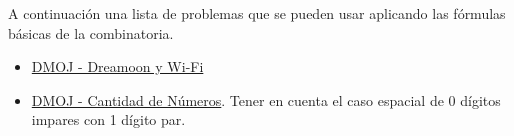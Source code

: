 A continuación una lista de problemas que se pueden usar aplicando las fórmulas básicas de la combinatoria.

\begin{itemize}
	\item \href{https://dmoj.uclv.edu.cu/problem/dreamoon}{DMOJ - Dreamoon y Wi-Fi}
	\item \href{https://dmoj.uclv.edu.cu/problem/ipnumber}{DMOJ - Cantidad de Números}. Tener en cuenta el caso espacial de 0 dígitos impares con 1 dígito par.
\end{itemize}